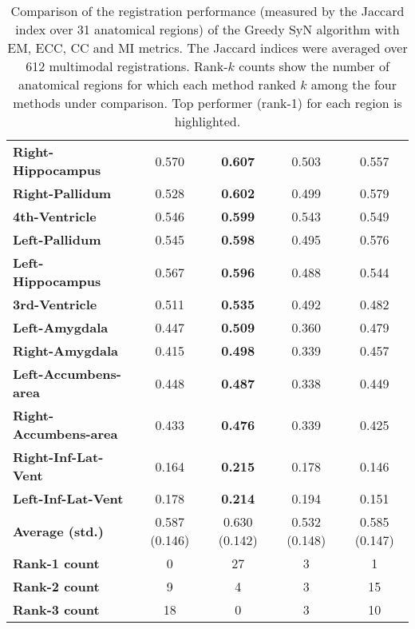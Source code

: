 \begin{table}[htbp]
\begin{adjustwidth}{-0.75cm}{}
{\begin{tabular}{lcccc}
    \textbf{Right-Hippocampus} & 0.570 & \textbf{0.607} & 0.503 & 0.557 \\
    \textbf{Right-Pallidum} & 0.528 & \textbf{0.602} & 0.499 & 0.579 \\
    \textbf{4th-Ventricle} & 0.546 & \textbf{0.599} & 0.543 & 0.549 \\
    \textbf{Left-Pallidum} & 0.545 & \textbf{0.598} & 0.495 & 0.576 \\
    \textbf{Left-Hippocampus} & 0.567 & \textbf{0.596} & 0.488 & 0.544 \\
    \textbf{3rd-Ventricle} & 0.511 & \textbf{0.535} & 0.492 & 0.482 \\
    \textbf{Left-Amygdala} & 0.447 & \textbf{0.509} & 0.360 & 0.479 \\
    \textbf{Right-Amygdala} & 0.415 & \textbf{0.498} & 0.339 & 0.457 \\
    \textbf{Left-Accumbens-area} & 0.448 & \textbf{0.487} & 0.338 & 0.449 \\
    \textbf{Right-Accumbens-area} & 0.433 & \textbf{0.476} & 0.339 & 0.425 \\
    \textbf{Right-Inf-Lat-Vent} & 0.164 & \textbf{0.215} & 0.178 & 0.146 \\
    \textbf{Left-Inf-Lat-Vent} & 0.178 & \textbf{0.214} & 0.194 & 0.151 \\
    \hline
    \textbf{Average (std.)} & 0.587 (0.146) & 0.630 (0.142) & 0.532 (0.148) & 0.585 (0.147) \\
    \textbf{Rank-1 count} & 0 & 27 & 3 & 1 \\
    \textbf{Rank-2 count} & 9 & 4 & 3 & 15 \\
    \textbf{Rank-3 count} & 18 & 0 & 3 & 10 \\
    \bottomrule
    \end{tabular}}%
    \caption{Comparison of the registration performance (measured by the Jaccard index over 31 anatomical regions) of the Greedy SyN algorithm with EM, ECC, CC and MI metrics.
The Jaccard indices were averaged over 612 multimodal registrations. Rank-$k$ counts show the number of anatomical regions for which each
method ranked $k$ among the four methods under comparison. Top performer (rank-1) for each region is highlighted.}
  \label{tab:multimodal_results_seg}%
\end{adjustwidth}
\end{table}%
